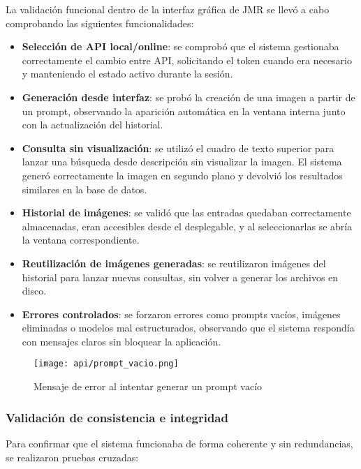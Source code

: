 La validación funcional dentro de la interfaz gráfica de JMR se llevó a cabo comprobando las siguientes funcionalidades:

\begin{itemize}
    \item \textbf{Selección de API local/online}: se comprobó que el sistema gestionaba correctamente el cambio entre API, solicitando el token cuando era necesario y manteniendo el estado activo durante la sesión.

    \item \textbf{Generación desde interfaz}: se probó la creación de una imagen a partir de un prompt, observando la aparición automática en la ventana interna junto con la actualización del historial.

    \item \textbf{Consulta sin visualización}: se utilizó el cuadro de texto superior para lanzar una búsqueda desde descripción sin visualizar la imagen. El sistema generó correctamente la imagen en segundo plano y devolvió los resultados similares en la base de datos.

    \item \textbf{Historial de imágenes}: se validó que las entradas quedaban correctamente almacenadas, eran accesibles desde el desplegable, y al seleccionarlas se abría la ventana correspondiente.

    \item \textbf{Reutilización de imágenes generadas}: se reutilizaron imágenes del historial para lanzar nuevas consultas, sin volver a generar los archivos en disco.

    \item \textbf{Errores controlados}: se forzaron errores como prompts vacíos, imágenes eliminadas o modelos mal estructurados, observando que el sistema respondía con mensajes claros sin bloquear la aplicación.
\end{itemize}

\begin{figure}[H]
    \centering
    \texttt{[image: api/prompt\_vacio.png]}
    \caption{Mensaje de error al intentar generar un prompt vacío}
\end{figure}

\subsubsection{Validación de consistencia e integridad}

Para confirmar que el sistema funcionaba de forma coherente y sin redundancias, se realizaron pruebas cruzadas:

